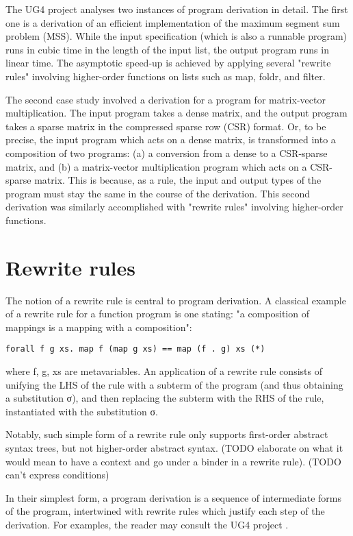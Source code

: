 \documentclass[bsc,frontabs,oneside,singlespacing,parskip,deptreport]{infthesis}
\theoremstyle{definition}
\theoremstyle{lemma}
\begin{document}
The UG4 project analyses two instances of program derivation in
detail. The first one is a derivation of an efficient implementation
of the maximum segment sum problem (MSS). While the input
specification (which is also a runnable program) runs in cubic time in
the length of the input list, the output program runs in linear
time. The asymptotic speed-up is achieved by applying several "rewrite
rules" involving higher-order functions on lists such as map, foldr,
and filter.

The second case study involved a derivation for a program for
matrix-vector multiplication. The input program takes a dense matrix,
and the output program takes a sparse matrix in the compressed sparse
row (CSR) format. Or, to be precise, the input program which acts on a
dense matrix, is transformed into a composition of two programs: (a) a
conversion from a dense to a CSR-sparse matrix, and (b) a
matrix-vector multiplication program which acts on a CSR-sparse
matrix. This is because, as a rule, the input and output types of the
program must stay the same in the course of the derivation. This
second derivation was similarly accomplished with "rewrite rules"
involving higher-order functions.

\section{Rewrite rules}
\label{sec:rewrite-rules}

The notion of a rewrite rule is central to program derivation. A
classical example of a rewrite rule for a function program is one
stating: "a composition of mappings is a mapping with a composition":

\begin{verbatim}
forall f g xs. map f (map g xs) == map (f . g) xs (*)
\end{verbatim}

where f, g, xs are metavariables. An application of a rewrite rule
consists of unifying the LHS of the rule with a subterm of the program
(and thus obtaining a substitution σ), and then replacing the
subterm with the RHS of the rule, instantiated with the substitution
σ.

Notably, such simple form of a rewrite rule only supports first-order
abstract syntax trees, but not higher-order abstract syntax. (TODO
elaborate on what it would mean to have a context and go under a
binder in a rewrite rule). (TODO can't express conditions)

In their simplest form, a program derivation is a sequence of
intermediate forms of the program, intertwined with rewrite rules
which justify each step of the derivation. For examples, the reader
may consult the UG4 project \cite{TODO}.
\end{document}
